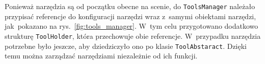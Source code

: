 

Ponieważ narzędzia są od początku obecne na scenie, 
do \texttt{ToolsManager} należało przypisać referencje do konfiguracji narzędzi wraz z~samymi obiektami narzędzi,
jak~pokazano na rys.~\ref{fig:tools_manager}.
W~tym celu przygotowano dodatkowo strukturę \texttt{ToolHolder},
która przechowuje obie referencje.
W~przypadku narzędzia potrzebne było jeszcze,
aby dziedziczyło ono po klasie \texttt{ToolAbstaract}.
Dzięki temu można zarządzać narzędziami niezależnie od ich funkcji.

